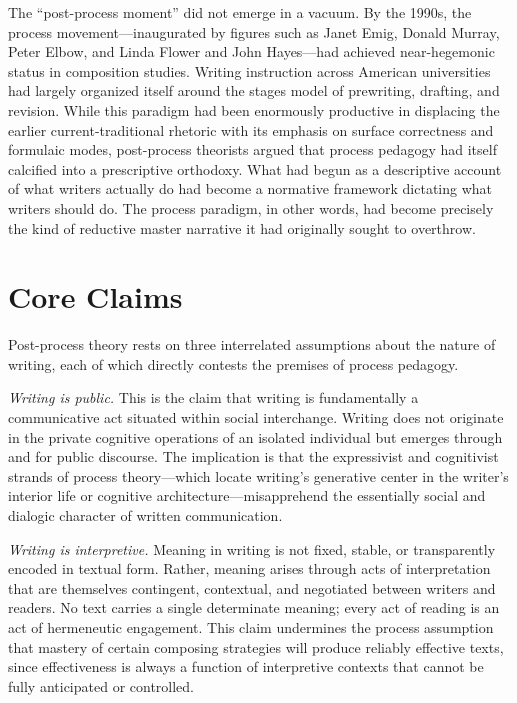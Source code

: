\documentclass[12pt]{article}
\begin{document}
The ``post-process moment'' did not emerge in a vacuum. By the 1990s, the process movement---inaugurated by figures such as Janet Emig, Donald Murray, Peter Elbow, and Linda Flower and John Hayes---had achieved near-hegemonic status in composition studies. Writing instruction across American universities had largely organized itself around the stages model of prewriting, drafting, and revision. While this paradigm had been enormously productive in displacing the earlier current-traditional rhetoric with its emphasis on surface correctness and formulaic modes, post-process theorists argued that process pedagogy had itself calcified into a prescriptive orthodoxy. What had begun as a descriptive account of what writers actually do had become a normative framework dictating what writers should do. The process paradigm, in other words, had become precisely the kind of reductive master narrative it had originally sought to overthrow.

\section{Core Claims}

Post-process theory rests on three interrelated assumptions about the nature of writing, each of which directly contests the premises of process pedagogy.

\textit{Writing is public.} This is the claim that writing is fundamentally a communicative act situated within social interchange. Writing does not originate in the private cognitive operations of an isolated individual but emerges through and for public discourse. The implication is that the expressivist and cognitivist strands of process theory---which locate writing's generative center in the writer's interior life or cognitive architecture---misapprehend the essentially social and dialogic character of written communication.

\textit{Writing is interpretive.} Meaning in writing is not fixed, stable, or transparently encoded in textual form. Rather, meaning arises through acts of interpretation that are themselves contingent, contextual, and negotiated between writers and readers. No text carries a single determinate meaning; every act of reading is an act of hermeneutic engagement. This claim undermines the process assumption that mastery of certain composing strategies will produce reliably effective texts, since effectiveness is always a function of interpretive contexts that cannot be fully anticipated or controlled.
\end{document}
